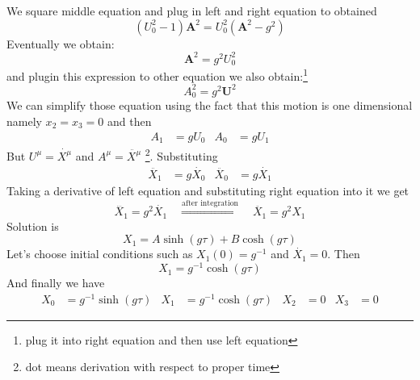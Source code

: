 We square middle equation and plug in left and right equation to obtained
%
\begin{equation}
	(U_0^2 - 1)\boldsymbol{A}^2  = U_0^2  (\boldsymbol{A}^2 -g^2)
\end{equation}
%
Eventually we obtain:
%
\begin{equation}
	\boldsymbol{A}^2 = g^2 U_0^2
\end{equation}
%
and plugin this expression to other equation we also obtain:\footnote{plug it
	into right equation and then use left equation}
%
\begin{equation}
	A_0^2 = g^2 \boldsymbol{U}^2
\end{equation}
%
We can simplify those equation using the fact that this motion is one
dimensional namely $x_2=x_3=0$ and then
%
\begin{align}
	A_1 & = g U_0 & A_0 & = g U_1
\end{align}
%
But $U^\mu = \dot{X^\mu}$ and $A^\mu = \ddot{X^\mu}$ \footnote{dot means
	derivation with respect to proper time}. Substituting
%
\begin{align}
	\ddot{X_1} & = g \dot{X_0} & \ddot{X_0} & = g \dot{X_1}
\end{align}
%
Taking a derivative of left equation and substituting right equation into it we
get
%
\begin{equation}
	\dddot{X_1} = g^2 \dot{X_1}
	\quad \stackrel{\text{after integration}}{\Rightarrow} \quad
	\ddot{X_1} = g^2 X_1
\end{equation}
%
Solution is
%
\begin{equation}
	X_1 = A \sinh(g\tau) + B \cosh(g\tau)
\end{equation}
%
Let's choose initial conditions such as $X_1(0) = g^{-1}$ and $\dot{X_1}=0$. Then
%
\begin{equation}
	X_1 = g^{-1} \cosh(g\tau)
\end{equation}
%
And finally we have
%
\begin{align}
	X_0 & = g^{-1} \sinh(g\tau) & X_1 & = g^{-1} \cosh(g\tau) & X_2 & = 0 & X_3 & = 0
	\label{eq:hiper}
\end{align}
%
